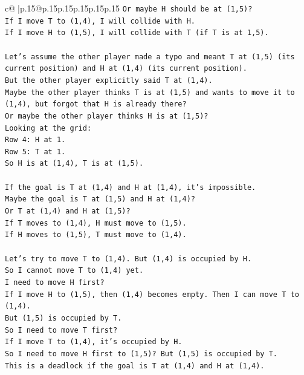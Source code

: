 \documentclass{article}
\begin{document}
{\begin{supertabular}{c@{$\;$}|p{.15\linewidth}@{}p{.15\linewidth}p{.15\linewidth}p{.15\linewidth}p{.15\linewidth}p{.15\linewidth}}
{{{\texttt{Or maybe H should be at (1,5)?} \\
\texttt{If I move T to (1,4), I will collide with H.} \\
\texttt{If I move H to (1,5), I will collide with T (if T is at 1,5).} \\
\\ 
\texttt{Let's assume the other player made a typo and meant T at (1,5) (its current position) and H at (1,4) (its current position).} \\
\texttt{But the other player explicitly said T at (1,4).} \\
\texttt{Maybe the other player thinks T is at (1,5) and wants to move it to (1,4), but forgot that H is already there?} \\
\texttt{Or maybe the other player thinks H is at (1,5)?} \\
\texttt{Looking at the grid:} \\
\texttt{Row 4: H at 1.} \\
\texttt{Row 5: T at 1.} \\
\texttt{So H is at (1,4), T is at (1,5).} \\
\\ 
\texttt{If the goal is T at (1,4) and H at (1,4), it's impossible.} \\
\texttt{Maybe the goal is T at (1,5) and H at (1,4)?} \\
\texttt{Or T at (1,4) and H at (1,5)?} \\
\texttt{If T moves to (1,4), H must move to (1,5).} \\
\texttt{If H moves to (1,5), T must move to (1,4).} \\
\\ 
\texttt{Let's try to move T to (1,4). But (1,4) is occupied by H.} \\
\texttt{So I cannot move T to (1,4) yet.} \\
\texttt{I need to move H first?} \\
\texttt{If I move H to (1,5), then (1,4) becomes empty. Then I can move T to (1,4).} \\
\texttt{But (1,5) is occupied by T.} \\
\texttt{So I need to move T first?} \\
\texttt{If I move T to (1,4), it's occupied by H.} \\
\texttt{So I need to move H first to (1,5)? But (1,5) is occupied by T.} \\
\texttt{This is a deadlock if the goal is T at (1,4) and H at (1,4).} \\
}}}
\end{supertabular}}
\end{document}
